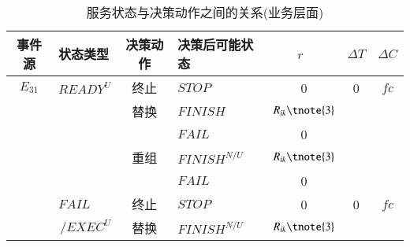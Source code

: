 \begin{table}[htbp]
    \caption{服务状态与决策动作之间的关系(业务层面)}
    \vspace{-0.5em}\label{table:state_action_bp}\centering{}
    \begin{threeparttable}
        \begin{tabular}{clclccc}
            \toprule
            事件源 & 状态类型\tnote{1} & 决策动作 & 决策后可能状态\tnote{1} & $r$~\tnote{2} & {$\Delta T$} & {$\Delta C$} \\
            \midrule
            
            {$E_{31}$} 
            & {${READY^U}$}
            & {终止}
            & {$STOP$} 
            & {0} 
            & {0} 
            & {$fc$} \\
            
            {}
            & {}
            & {替换} 
            & {$FINISH$} 
            & $R_{ik}\tnote{3}$ 
            & {\multirow{2}{*}{$T_{ik}-T_{i0}$}} 
            & {\multirow{2}{*}{$C_{ik}-C_{i0}$}} \\
            
            {}
            & {}
            & {} 
            & {$FAIL$} 
            & {0}
            & {} 
            & {} \\
            
            {}
            & {}
            & {重组} 
            & {$FINISH^{N/U}$} 
            & $R_{ik}\tnote{3}$ 
            & {\multirow{2}{*}{$\sum\limits_{x = i}^j {({T_{xk}} - {T_{x0}})} $}}
            & {\multirow{2}{*}{$\sum\limits_{x = i}^j {({C_{xk}} - {C_{x0}})} $}} \\
            
            
            {}
            & {}
            & {} 
            & {$FAIL$} 
            & {0}
            & {} 
            & {} \\
            
            {} 
            & {${FAIL}$}
            & {终止}
            & {$STOP$} 
            & {0} 
            & {0} 
            & {$fc$} \\
            
            {}
            & \multicolumn{1}{r}{$/EXEC^U$}
            & {替换} 
            & {${FINISH}^{N/U}$} 
            & $R_{ik}\tnote{3}$ 
            & {\multirow{2}{*}{$T_{ik}$}} 
            & {\multirow{2}{*}{$C_{ik}$}} \\
            

\end{tabular}
\end{threeparttable}
\end{table}
